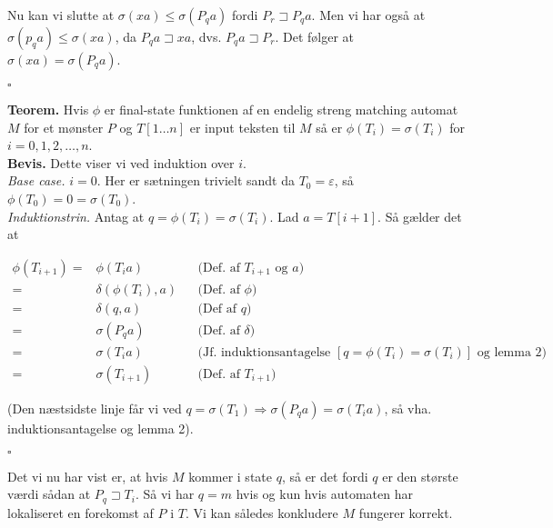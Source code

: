 \documentclass[12pt]{article}
\begin{document}
Nu kan vi slutte at $\sigma(xa) \le \sigma(P_q a)$ fordi $P_r \sqsupset P_q a$. Men vi har også at  $\sigma(p_q a) \le \sigma(xa)$, da $P_q a \sqsupset xa$, dvs. $P_q a \sqsupset P_r$. Det følger at $\sigma(xa)=\sigma(P_q a)$.

\begin{flushright}
    $\square$
\end{flushright}

\textbf{Teorem.} Hvis $\phi$ er final-state funktionen af en endelig streng matching automat $M$ for et mønster $P$ og $T[1\ldots n]$ er input teksten til $M$ så er $\phi(T_i)=\sigma(T_i)$ for $i=0,1,2,\ldots,n$. \\

\textbf{Bevis.} Dette viser vi ved induktion over $i$. \\

\textit{Base case.} $i=0$. Her er sætningen trivielt sandt da $T_0=\varepsilon$, så $\phi(T_0)=0=\sigma(T_0)$. \\

\textit{Induktionstrin.} Antag at $q=\phi(T_i)=\sigma(T_i)$. Lad $a=T[i+1]$. Så gælder det at 

\begin{align*}
    \phi(T_{i+1}) =& \phi(T_i a) && \text{(Def. af } T_{i+1} \text{ og } a) \\
    =& \delta(\phi(T_i),a) && \text{(Def. af } \phi) \\
    =& \delta(q,a) && \text{(Def af } q) \\
    =& \sigma(P_q a) && \text{(Def. af } \delta) \\
    =& \sigma(T_i a) && \text{(Jf. induktionsantagelse } [q=\phi(T_i)=\sigma(T_i)] \text{ og lemma 2)} \\
    =& \sigma(T_{i+1}) && \text{(Def. af } T_{i+1})
\end{align*}

(Den næstsidste linje får vi ved $q=\sigma(T_1) \Rightarrow \sigma(P_qa)=\sigma(T_ia)$, så vha. induktionsantagelse og lemma 2).

\begin{flushright}
    $\square$
\end{flushright}

Det vi nu har vist er, at hvis $M$ kommer i state $q$, så er det fordi $q$ er den største værdi sådan at $P_q \sqsupset T_i$. Så vi har $q=m$ hvis og kun hvis automaten har lokaliseret en forekomst af $P$ i $T$. Vi kan således konkludere $M$ fungerer korrekt.

\newpage
\end{document}
